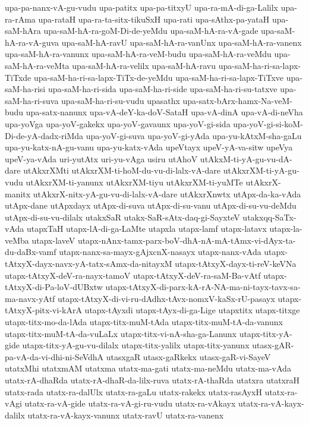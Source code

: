 {upa-pa-nanx-vA-gu-vudu
upa-patitx
upa-pa-titxyU
upa-ra-mA-di-ga-Lalilx
upa-ra-rAma
upa-rataH
upa-ra-ta-sitx-tikuSxH
upa-rati
upa-sAthx-pa-yataH
upa-saM-hAra
upa-saM-hA-ra-goM-Di-de-yeMdu
upa-saM-hA-ra-vA-gade
upa-saM-hA-ra-vA-guva
upa-saM-hA-ravU
upa-saM-hA-ra-vanUnx
upa-saM-hA-ra-vanenx
upa-saM-hA-ra-vanunx
upa-saM-hA-ra-veM-budu
upa-saM-hA-ra-veMdu
upa-saM-hA-ra-veMta
upa-saM-hA-ra-velilx
upa-saM-hA-ravu
upa-saM-ha-ri-sa-lapx-TiTxde
upa-saM-ha-ri-sa-lapx-TiTx-de-yeMdu
upa-saM-ha-ri-sa-lapx-TiTxve
upa-saM-ha-risi
upa-saM-ha-ri-sida
upa-saM-ha-ri-side
upa-saM-ha-ri-su-tatxve
upa-saM-ha-ri-suva
upa-saM-ha-ri-su-vudu
upasathx
upa-satx-bArx-hamx-Na-veM-budu
upa-satx-nanunx
upa-vA-deY-ka-doV-SataH
upa-vA-dinA
upa-vA-di-neVha
upa-yoVga
upa-yoV-gakekx
upa-yoV-gavaunx
upa-yoV-gi-sida
upa-yoV-gi-si-koM-Di-de-yA-dadx-riMda
upa-yoV-gi-suva
upa-yoV-gi-yAda
upa-yu-kAtxM-sha-gaLu
upa-yu-katx-nA-gu-vanu
upa-yu-katx-vAda
upeVtayx
upeV-yA-va-sitw
upeVya
upeV-ya-vAda
uri-yutAtx
uri-yu-vAga
usiru
utAhoV
utAkxM-ti-yA-gu-vu-dA-dare
utAkxrXMti
utAkxrXM-ti-hoM-du-vu-di-lalx-vA-dare
utAkxrXM-ti-yA-gu-vudu
utAkxrXM-ti-yanunx
utAkxrXM-tiyu
utAkxrXM-ti-yuMTe
utAkxrX-manitx
utAkxrX-nitx-yA-gu-vu-di-lalx-vA-dare
utAkxrXnwtx
utApx-da-ka-vAda
utApx-dane
utApxdayx
utApx-di-suva
utApx-di-su-vanu
utApx-di-su-vu-deMdu
utApx-di-su-vu-dilalx
utakxSaR
utakx-SaR-sAtx-daq-gi-SayxteV
utakxqq-SaTx-vAda
utapxTaH
utapx-lA-di-ga-LaMte
utapxla
utapx-lamf
utapx-latavx
utapx-la-veMba
utapx-laveV
utapx-nAnx-tamx-parx-boV-dhA-nA-mA-tAmx-vi-dAyx-ta-du-daBx-vamf
utapx-nanx-sa-mayx-gAjxcnX-nasayx
utapx-nanx-vAda
utapx-tAtxyX-dayx-navx-yA-tatx-sAmx-da-nitayxM
utapx-tAtxyX-dayx-ti-reV-keVNa
utapx-tAtxyX-deV-ra-nayx-tamoV
utapx-tAtxyX-deV-ra-saM-Ba-vAtf
utapx-tAtxyX-di-Pa-loV-dUBxtw
utapx-tAtxyX-di-parx-kA-rA-NA-ma-ni-tayx-tavx-sa-ma-navx-yAtf
utapx-tAtxyX-di-vi-ru-dAdhx-tAvx-nomxV-kaSx-rU-pasayx
utapx-tAtxyX-pitx-vi-kArA
utapx-tAyxdi
utapx-tAyx-di-ga-Lige
utapxtitx
utapx-titxge
utapx-titx-mo-da-lAda
utapx-titx-muM-tAda
utapx-titx-muM-tA-da-vanunx
utapx-titx-muM-tA-da-vuLaLx
utapx-titx-vi-nA-sha-ga-Lanunx
utapx-titx-yA-gide
utapx-titx-yA-gu-vu-dilalx
utapx-titx-yalilx
utapx-titx-yanunx
utasx-gAR-pa-vA-da-vi-dhi-ni-SeVdhA
utasxgaR
utasx-gaRkekx
utasx-gaR-vi-SayeV
utatxMhi
utatxmAM
utatxma
utatx-ma-gati
utatx-ma-neMdu
utatx-ma-vAda
utatx-rA-dhaRda
utatx-rA-dhaR-da-lilx-ruva
utatx-rA-thaRda
utatxra
utatxraH
utatx-rada
utatx-ra-dalUlx
utatx-ra-gaLu
utatx-rakekx
utatx-rasAyxH
utatx-ra-vAgi
utatx-ra-vA-gide
utatx-ra-vA-gi-ru-vudu
utatx-ra-vAkayx
utatx-ra-vA-kayx-dalilx
utatx-ra-vA-kayx-vanunx
utatx-ravU
utatx-ra-vanenx
}
